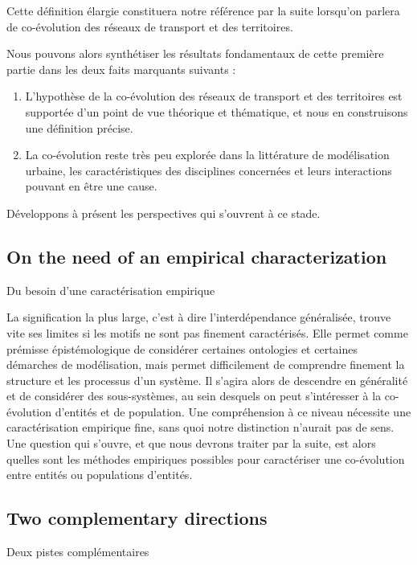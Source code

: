 Cette définition élargie constituera notre référence par la suite lorsqu'on parlera de co-évolution des réseaux de transport et des territoires.



Nous pouvons alors synthétiser les résultats fondamentaux de cette première partie dans les deux faits marquants suivants :
\begin{enumerate}
	\item L'hypothèse de la co-évolution des réseaux de transport et des territoires est supportée d'un point de vue théorique et thématique, et nous en construisons une définition précise.
	\item La co-évolution reste très peu explorée dans la littérature de modélisation urbaine, les caractéristiques des disciplines concernées et leurs interactions pouvant en être une cause.
\end{enumerate}

Développons à présent les perspectives qui s'ouvrent à ce stade.


\subsection*{On the need of an empirical characterization}{Du besoin d'une caractérisation empirique}

La signification la plus large, c'est à dire l'interdépendance généralisée, trouve vite ses limites si les motifs ne sont pas finement caractérisés. Elle permet comme prémisse épistémologique de considérer certaines ontologies et certaines démarches de modélisation, mais permet difficilement de comprendre finement la structure et les processus d'un système. Il s'agira alors de descendre en généralité et de considérer des sous-systèmes, au sein desquels on peut s'intéresser à la co-évolution d'entités et de population. Une compréhension à ce niveau nécessite une caractérisation empirique fine, sans quoi notre distinction n'aurait pas de sens. Une question qui s'ouvre, et que nous devrons traiter par la suite, est alors quelles sont les méthodes empiriques possibles pour caractériser une co-évolution entre entités ou populations d'entités.


\subsection*{Two complementary directions}{Deux pistes complémentaires}


